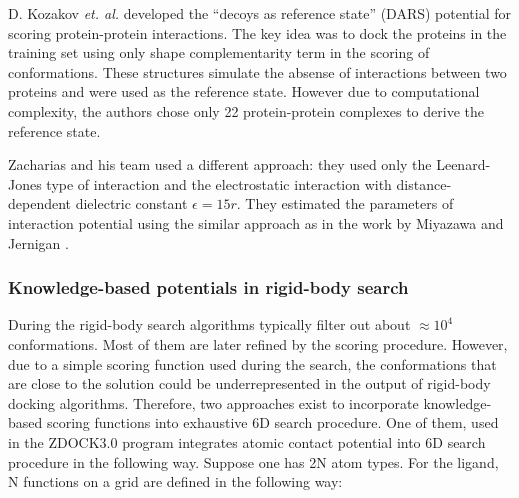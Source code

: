 D. Kozakov \emph{et. al.} developed the ``decoys as reference state'' (DARS) potential for scoring protein-protein interactions. The key idea was to dock the proteins in the training set 
using only shape complementarity term in the scoring of conformations. These structures simulate the absense of interactions between two proteins and were
used as the reference state. However due to computational complexity, the authors chose only 22 protein-protein complexes to derive the reference state.

Zacharias and his team used a different approach: they used only the Leenard-Jones type of interaction and the electrostatic interaction with distance-dependent dielectric constant $\epsilon=15r$.
They estimated the parameters of interaction potential using the similar approach as in the work by Miyazawa and Jernigan \cite{miyazawa1999self}.

\subsubsection{Knowledge-based potentials in rigid-body search}
During the rigid-body search algorithms typically filter out about $\approx 10^4$ conformations. Most of them are later refined by the scoring procedure. However, due to
a simple scoring function used during the search, the conformations that are close to the solution could be underrepresented in the output of rigid-body docking algorithms.
Therefore, two approaches exist to incorporate knowledge-based scoring functions into exhaustive 6D search procedure. 
One of them, used in the ZDOCK3.0 program \cite{mintseris2007integrating} integrates atomic contact potential into 6D search procedure in the following way. Suppose
one has 2N atom types. For the ligand, N functions on a grid are defined in the following way:

